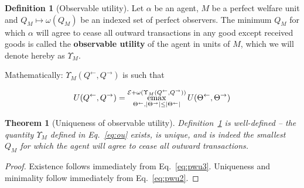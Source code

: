 \documentclass{journal}
\theoremstyle{plain}
\newtheorem{thm}{Theorem}
\theoremstyle{definition}
\newtheorem{dfn}{Definition}
\newcommand{\economy}{\ensuremath{\mathcal{E}}}
\newcommand{\emax}{\ensuremath{\operatornamewithlimits{emax}}}
\begin{document}
\begin{dfn}[Observable utility]
    \label{dfn:ou}
    Let $\alpha$ be an agent, $M$ be a perfect welfare unit and $Q_M\mapsto \omega(Q_M)$ be an indexed set of perfect observers. The minimum $Q_M$ for which $\alpha$ will agree to cease all outward transactions in any good except received goods is called the \textbf{observable utility} of the agent in units of $M$, which we will denote hereby as $\Upsilon_M$.
    
    Mathematically: $\Upsilon_M(Q^\leftarrow, Q^\rightarrow)$ is such that 
    
    \begin{equation}
        \label{eq:ou}
        U(Q^\leftarrow, Q^\rightarrow) = \emax\limits_{\Theta^\leftarrow, |\Theta^\rightarrow|\le |\Theta^{\leftarrow}|}^{\economy + \omega(\Upsilon_M(Q^\leftarrow, Q^\rightarrow))} U(\Theta^\leftarrow, \Theta^\rightarrow)
    \end{equation}
\end{dfn}

\begin{thm}[Uniqueness of observable utility]
    \label{thm:unique}
    Definition~\ref{dfn:ou} is well-defined -- the quantity $\Upsilon_M$ defined in Eq.~\ref{eq:ou} exists, is unique, and is indeed the smallest $Q_M$ for which the agent will agree to cease all outward transactions. 
\end{thm}
\begin{proof}
    Existence follows immediately from Eq.~\ref{eq:pwu3}. Uniqueness and minimality follow immediately from Eq.~\ref{eq:pwu2}.
\end{proof}
\end{document}
